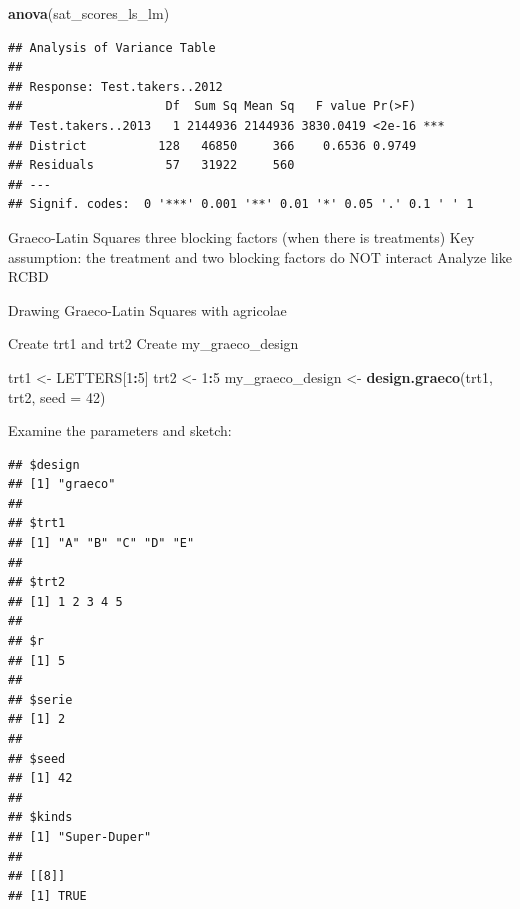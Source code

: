 \documentclass[]{book}
\newenvironment{Shaded}{\begin{snugshade}}{\end{snugshade}}
\newcommand{\DataTypeTok}[1]{\textcolor[rgb]{0.13,0.29,0.53}{#1}}
\newcommand{\DecValTok}[1]{\textcolor[rgb]{0.00,0.00,0.81}{#1}}
\newcommand{\KeywordTok}[1]{\textcolor[rgb]{0.13,0.29,0.53}{\textbf{#1}}}
\newcommand{\NormalTok}[1]{#1}
\newcommand{\OperatorTok}[1]{\textcolor[rgb]{0.81,0.36,0.00}{\textbf{#1}}}
\newcommand{\StringTok}[1]{\textcolor[rgb]{0.31,0.60,0.02}{#1}}
\begin{document}
\begin{Shaded}
\begin{Highlighting}[]
\KeywordTok{anova}\NormalTok{(sat_scores_ls_lm)}
\end{Highlighting}
\end{Shaded}

\begin{verbatim}
## Analysis of Variance Table
## 
## Response: Test.takers..2012
##                    Df  Sum Sq Mean Sq   F value Pr(>F)    
## Test.takers..2013   1 2144936 2144936 3830.0419 <2e-16 ***
## District          128   46850     366    0.6536 0.9749    
## Residuals          57   31922     560                     
## ---
## Signif. codes:  0 '***' 0.001 '**' 0.01 '*' 0.05 '.' 0.1 ' ' 1
\end{verbatim}

Graeco-Latin Squares
three blocking factors (when there is treatments)
Key assumption: the treatment and two blocking factors do NOT interact
Analyze like RCBD

Drawing Graeco-Latin Squares with agricolae

Create trt1 and trt2
Create my\_graeco\_design

\begin{Shaded}
\begin{Highlighting}[]
\NormalTok{trt1 <-}\StringTok{ }\NormalTok{LETTERS[}\DecValTok{1}\OperatorTok{:}\DecValTok{5}\NormalTok{]}
\NormalTok{trt2 <-}\StringTok{ }\DecValTok{1}\OperatorTok{:}\DecValTok{5}
\NormalTok{my_graeco_design <-}\StringTok{ }\KeywordTok{design.graeco}\NormalTok{(trt1, trt2, }\DataTypeTok{seed =} \DecValTok{42}\NormalTok{)}
\end{Highlighting}
\end{Shaded}

Examine the parameters and sketch:

\begin{Shaded}
\end{Shaded}

\begin{verbatim}
## $design
## [1] "graeco"
## 
## $trt1
## [1] "A" "B" "C" "D" "E"
## 
## $trt2
## [1] 1 2 3 4 5
## 
## $r
## [1] 5
## 
## $serie
## [1] 2
## 
## $seed
## [1] 42
## 
## $kinds
## [1] "Super-Duper"
## 
## [[8]]
## [1] TRUE
\end{verbatim}
\end{document}
